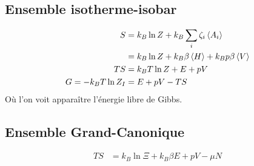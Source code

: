\subsection{Ensemble isotherme-isobar}

\begin{align}
    S&=k_B\ln Z+k_B\sum_i\zeta_i\expval{A_i}\\
     &=k_B\ln Z+k_B\beta\expval{H}+k_Bp\beta\expval{V}\\
    TS&=k_BT\ln Z+E+pV\\
    G=-k_BT\ln Z_I&=E+pV-TS
\end{align}
Où l'on voit apparaître l'énergie libre de Gibbs.

\subsection{Ensemble Grand-Canonique} %
\label{sub:Ensemble Grand-Canonique}

\begin{align}
    TS&=k_B\ln\Xi+k_B\beta E+pV-\mu N
\end{align}



